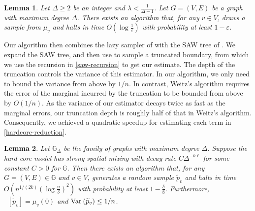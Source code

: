\documentclass[10pt,a4paper]{article}
\newtheorem{theorem}{Theorem}[section]
\newtheorem{lemma}{Lemma}[section]
\newcommand{\htodo}[1]{\todo[color=green!30]{Heng: #1}}
\newcommand{\Ex}{\mathop{\mathbb{{}E}}\nolimits}
\def\=#1{\mathbb{#1}}
\newcommand{\eps}{\varepsilon}
\newcommand{\Var}[2]{\ensuremath{\textnormal{Var}_{#1}\left(#2\right)}}
\begin{document}
\begin{lemma}  \label{lem:truncate-AJ}
  Let $\Delta\ge 2$ be an integer and $\lambda<\frac{1}{\Delta-1}$.
  Let $G=(V,E)$ be a graph with maximum degree $\Delta$.
  There exists an algorithm that, 
  for any $v\in V$,
  draws a sample from $\mu_v$
  and halts in time $O(\log \frac{1}{\eps})$ with probability at least $1-\eps$.
\end{lemma}


Our algorithm then combines the lazy sampler of  with the SAW tree of \cite{Wei06}.
We expand the SAW tree, and then use  to sample a truncated boundary,
from which we use the recursion in \eqref{saw-recursion} to get our estimate.
The depth of the truncation controls the variance of this estimator.
In our algorithm, we only need to bound the variance from above by $1/n$.
In contrast, Weitz's algorithm requires the error of the marginal incurred by the truncation to be bounded from above by $O(1/n)$.
As the variance of our estimator decays twice as fast as the marginal errors,
our truncation depth is roughly half of that in Weitz's algorithm.
Consequently, we achieved a quadratic speedup for estimating each term in \eqref{hardcore-reduction}.

\begin{lemma}
\label{small-lambda-alg}
Let $\=G_{\Delta}$ be the family of graphs with maximum degree $\Delta$.
Suppose the hard-core model has strong spatial mixing with decay rate $C\Delta^{-k\ell}$ for some constant $C>0$ for $\=G$.
Then there exists an algorithm that, for any $G=(V,E)\in\=G$ and $v\in V$, generates a random sample $\widetilde{p}_v$ and halts in time $O(n^{1/(2k)}(\log \frac{n}{\delta})^2)$ with probability at least $1-\frac{\delta}{8}$.
Furthermore, $\Ex[\widetilde{p}_v]=\mu_v(0)$ and $\Var{}{\widetilde{p}_v}\le 1/n$. 
\end{lemma}
\end{document}
